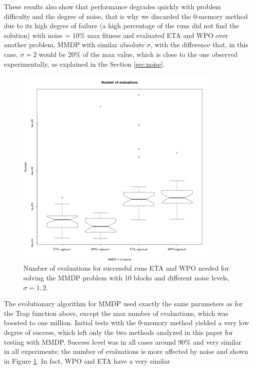 \documentclass{svmult}
\begin{document}
These results also show that performance degrades quickly with problem
difficulty and the degree of noise, that is why we discarded the
0-memory method due to its high degree of failure (a high percentage of the runs did not find the solution) with noise = 10\%
max fitness and evaluated ETA and WPO over another problem, MMDP with
similar absolute $\sigma$, with the difference that, in this case,
$\sigma=2$ would be 20\% of the max value, which is close to the one
observed experimentally, as explained in the Section \ref{sec:noise}.
\begin{figure}[!t] %
\centering
\includegraphics[width=0.9\textwidth]{../images/evals-mmdp.png}
\caption{Number of evaluations for successful runs ETA and WPO needed for solving the MMDP
  problem with 10 blocks and different noise levels, $\sigma=1,2$. \label{fig:mmdp:evals}}
\end{figure}
%
The evolutionary algorithm for MMDP used exactly the same parameters
as for the Trap function above, except the max number of evaluations, which
was boosted to one million. Initial tests with the 0-memory method
yielded a very low degree of success, which left only the two methods
analyzed in this paper for testing with MMDP. 
Success level was in all cases around 90\% and very similar in all experiments; the number of evaluations is more affected by noise and shown in
Figure \ref{fig:mmdp:evals}. 
In fact, WPO and ETA have a very similar
\end{document}
